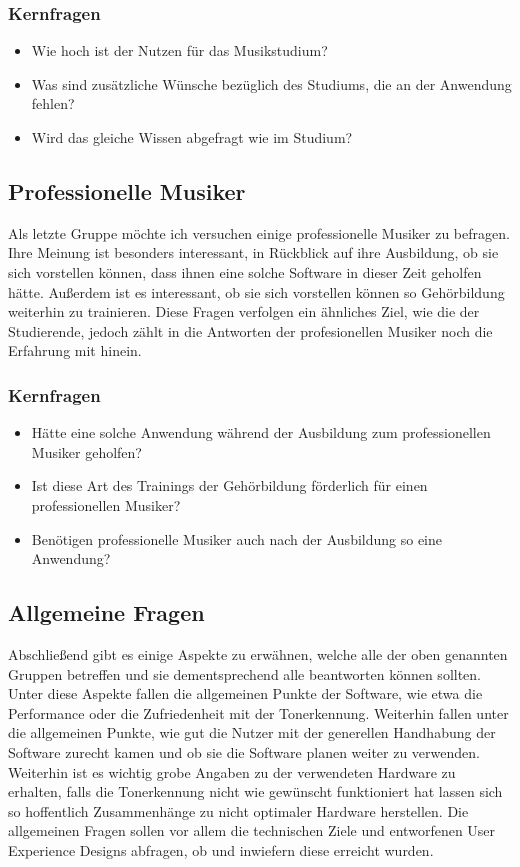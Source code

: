 \subsubsection*{Kernfragen}
\begin{itemize}
    \item Wie hoch ist der Nutzen für das Musikstudium?
    \item Was sind zusätzliche Wünsche bezüglich des Studiums, die an der Anwendung fehlen?
    \item Wird das gleiche Wissen abgefragt wie im Studium?
\end{itemize}

\subsection{Professionelle Musiker}
Als letzte Gruppe möchte ich versuchen einige professionelle Musiker zu befragen. Ihre Meinung ist besonders interessant, in Rückblick auf ihre Ausbildung, ob sie sich vorstellen können, dass ihnen eine solche Software in dieser Zeit geholfen hätte. Außerdem ist es interessant, ob sie sich vorstellen können so Gehörbildung weiterhin zu trainieren. Diese Fragen verfolgen ein ähnliches Ziel, wie die der Studierende, jedoch zählt in die Antworten der profesionellen Musiker noch die Erfahrung mit hinein.   
\subsubsection*{Kernfragen}
\begin{itemize}
    \item Hätte eine solche Anwendung während der Ausbildung zum professionellen Musiker geholfen? 
    \item Ist diese Art des Trainings der Gehörbildung förderlich für einen professionellen Musiker?
    \item Benötigen professionelle Musiker auch nach der Ausbildung so eine Anwendung?
\end{itemize}

\subsection{Allgemeine Fragen}
Abschließend gibt es einige Aspekte zu erwähnen, welche alle der oben genannten Gruppen betreffen und sie dementsprechend alle beantworten können sollten. Unter diese Aspekte fallen die allgemeinen Punkte der Software, wie etwa die Performance oder die Zufriedenheit mit der Tonerkennung. Weiterhin fallen unter die allgemeinen Punkte, wie gut die Nutzer mit der generellen Handhabung der Software zurecht kamen und ob sie die Software planen weiter zu verwenden. Weiterhin ist es wichtig grobe Angaben zu der verwendeten Hardware zu erhalten, falls die Tonerkennung nicht wie gewünscht funktioniert hat lassen sich so hoffentlich Zusammenhänge zu nicht optimaler Hardware herstellen. Die allgemeinen Fragen sollen vor allem die technischen Ziele und entworfenen User Experience Designs abfragen, ob und inwiefern diese erreicht wurden.
